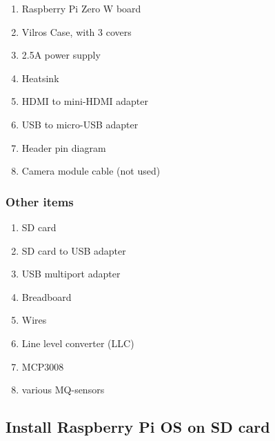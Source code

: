 \documentclass{article}
\begin{document}
\begin{enumerate}[noitemsep]
  \item Raspberry Pi Zero W board
  \item Vilros Case, with 3 covers
  \item 2.5A power supply
  \item Heatsink
  \item HDMI to mini-HDMI adapter
  \item USB to micro-USB adapter
  \item Header pin diagram
  \item Camera module cable (not used)
\end{enumerate}

\subsubsection{Other items}

\begin{enumerate}[noitemsep]
  \item SD card
  \item SD card to USB adapter
  \item USB multiport adapter
  \item Breadboard
  \item Wires
  \item Line level converter (LLC)
  \item MCP3008
  \item various MQ-sensors

\end{enumerate}

\subsection{Install Raspberry Pi OS on SD card}
\end{document}
